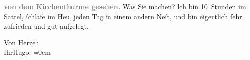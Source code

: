 \pstart
           \centering{}\textcolor{gray}{\textbf{von dem Kirchenthurme gesehen.}}\pend
           \vspace{1em}
\pstart
           \noindent{}{\pb}Was Sie machen? Ich bin
               10 Stunden im Sattel,{ }ſchlafe im Heu, jeden Tag in einem andern Neſt, und bin
               eigentlich{ }ſehr zufrieden und gut aufgelegt.\pend
           
\pstart
           Von Herzen{\\[\baselineskip]}Ihr\spacefill\mbox{Hugo.}\pend
           \leftskip=0em{}\endnumbering{}  \newcommand{\dateiname}{L01070}\newcommand{\titel}{Hugo von Hofmannsthal an Arthur Schnitzler, [3.?] 9. 1900}\newcommand{\editorInnen}{Martin Anton Müller und Gerd-Hermann Susen}
